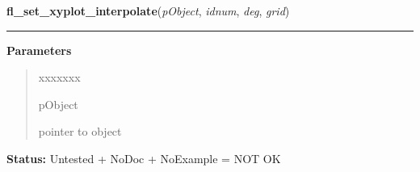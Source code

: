     \label{xformslib:library:fl_set_xyplot_interpolate}

    \vspace{0.5ex}

\hspace{.8\funcindent}\begin{boxedminipage}{\funcwidth}

    \raggedright \textbf{fl\_set\_xyplot\_interpolate}(\textit{pObject}, \textit{idnum}, \textit{deg}, \textit{grid})

    \vspace{-1.5ex}

    \rule{\textwidth}{0.5\fboxrule}
\setlength{\parskip}{2ex}
\setlength{\parskip}{1ex}
      \textbf{Parameters}
      \vspace{-1ex}

      \begin{quote}
        \begin{Ventry}{xxxxxxx}

          \item[pObject]

          pointer to object

        \end{Ventry}

      \end{quote}

\textbf{Status:} Untested + NoDoc + NoExample = NOT OK



    \end{boxedminipage}

    \label{xformslib:library:fl_set_xyplot_inspect}

    \vspace{0.5ex}

